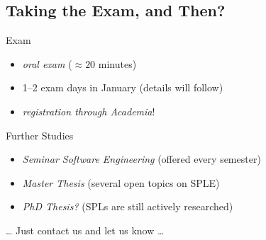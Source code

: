 \subsection{Taking the Exam, and Then?}

\begin{frame}{\myframetitle}
	\begin{mycolumns}
		\begin{definition}{Exam}
			\begin{itemize}
				\item \emph{oral exam} ($\approx 20$ minutes)
				\item 1--2 exam days in January (details will follow)
				\item \emph{registration through Academia}!
			\end{itemize}
		\end{definition}
	\mynextcolumn
		\begin{example}{Further Studies}
			\begin{itemize}
				\item \emph{Seminar Software Engineering} (offered every semester)
				\item \emph{Master Thesis} (several open topics on SPLE)
				\item \emph{PhD Thesis?} (SPLs are still actively researched)
			\end{itemize}
			\ldots{} Just contact us and let us know \ldots
		\end{example}
	\end{mycolumns}
\end{frame}
